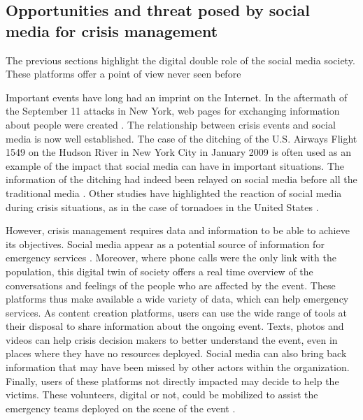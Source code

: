 \subsection{Opportunities and threat posed by social media for crisis management}
The previous sections highlight the digital double role of the social media society.
These platforms offer a point of view never seen before

Important events have long had an imprint on the Internet.
In the aftermath of the September 11 attacks in New York, web pages for exchanging information about people were created \textcite{palenCitizenCommunicationsCrisis2007}.
The relationship between crisis events and social media is now well established.
The case of the ditching of the U.S. Airways Flight 1549 on the Hudson River in New York City in January 2009 is often used as an example of the impact that social media can have in important situations.
The information of the ditching had indeed been relayed on social media before all the traditional media \textcite{murthyTwitter2018}.
Other studies have highlighted the reaction of social media during crisis situations, as in the case of tornadoes in the United States \textcite{justinei.blanfordTweetingTornadoes2014}.

However, crisis management requires data and information to be able to achieve its objectives.
Social media appear as a potential source of information for emergency services \textcite{tapiaSeekingTrustworthyTweet2011}.
Moreover, where phone calls were the only link with the population, this digital twin of society offers a real time overview of the conversations and feelings of the people who are affected by the event.
These platforms thus make available a wide variety of data, which can help emergency services.
As content creation platforms, users can use the wide range of tools at their disposal to share information about the ongoing event.
Texts, photos and videos can help crisis decision makers to better understand the event, even in places where they have no resources deployed.
Social media can also bring back information that may have been missed by other actors within the organization.
Finally, users of these platforms not directly impacted may decide to help the victims.
These volunteers, digital or not, could be mobilized to assist the emergency teams deployed on the scene of the event \textcite{batardIntegrerContributionsCitoyennes2021}.

